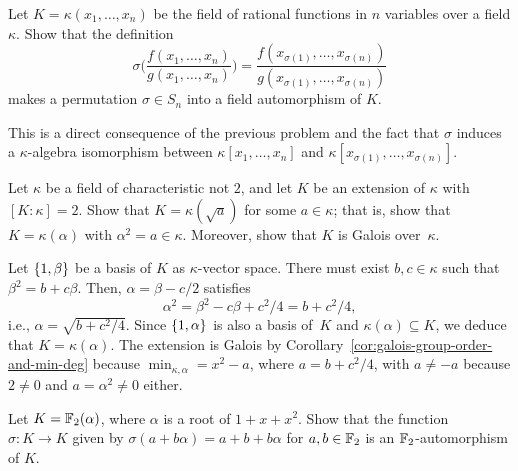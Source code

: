 \begin{probl}
    Let\/ $K = \kappa(x_1, \dots, x_n)$ be the field of rational functions in\/ $n$ variables over a field\/ $\kappa$. Show that the definition 
    $$
        \sigma\bigg(\frac{f(x_1,\dots,x_n)}{g(x_1,\dots,x_n)}\bigg)
            = \frac{f(x_{\sigma(1)},\dots,x_{\sigma(n)})}
                {g(x_{\sigma(1)},\dots,x_{\sigma(n)})}
    $$
    makes a permutation\/ $\sigma \in S_n$ into a field automorphism of\/ $K$.
\end{probl}

\begin{solution}
    This is a direct consequence of the previous problem and the fact that $\sigma$ induces a $\kappa$-algebra isomorphism between $\kappa[x_1,\dots,x_n]$ and $\kappa[x_{\sigma(1)},\dots,x_{\sigma(n)}]$.
\end{solution}

\begin{probl}
    Let\/ $\kappa$ be a field of characteristic not\/ $2$, and let\/ $K$ be an extension of\/ $\kappa$ with\/ $[K : \kappa] = 2$. Show that\/ $K = \kappa(\sqrt{a})$ for some\/ $a \in \kappa$; that is, show that\/ $K = \kappa(\alpha)$ with\/ $\alpha^2 = a \in \kappa$. Moreover, show that\/ $K$ is Galois over\/~$\kappa$.
\end{probl}

\begin{solution}
    Let $\{1,\beta\}$ be a basis of $K$ as $\kappa$-vector space. There must exist $b,c\in\kappa$ such that $\beta^2=b+c\beta$. Then, $\alpha=\beta-c/2$ satisfies
    $$
        \alpha^2 = \beta^2-c\beta+c^2/4 = b + c^2/4,
    $$
    i.e., $\alpha=\sqrt{b+c^2/4}$. Since $\{1,\alpha\}$ is also a basis of~$K$ and $\kappa(\alpha)\subseteq K$, we deduce that $K=\kappa(\alpha)$. The extension is Galois by Corollary~\ref{cor:galois-group-order-and-min-deg} because $\min_{\kappa,\alpha}=x^2-a$, where $a=b+c^2/4$, with $a\ne-a$ because $2\ne0$ and $a=\alpha^2\ne0$ either.
\end{solution}

\begin{probl}
    Let\/ $K = \mathbb F_2(\alpha)$, where\/ $\alpha$ is a root of\/ $1 + x + x^2$. Show that the function\/ $\sigma : K \rightarrow K$ given by\/ $\sigma(a + b\alpha) = a + b + b\alpha$ for $a, b \in\mathbb F_2$ is an\/ $\mathbb F_2$-automorphism of\/ $K$.
\end{probl}

